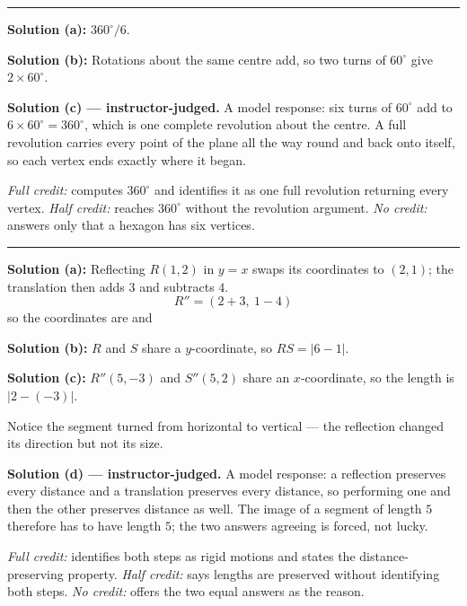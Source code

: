 \documentclass[12pt]{article}
\begin{document}
\vspace{0.2cm}\noindent\rule{\linewidth}{0.2pt}


\textbf{Solution (a):} $360^\circ / 6$. 

\textbf{Solution (b):} Rotations about the same centre add, so two turns of $60^\circ$ give $2 \times 60^\circ$. 

\textbf{Solution (c) --- instructor-judged.} A model response: six turns of $60^\circ$ add to $6 \times 60^\circ = 360^\circ$, which is one complete revolution about the centre. A full revolution carries every point of the plane all the way round and back onto itself, so each vertex ends exactly where it began.

\emph{Full credit:} computes $360^\circ$ and identifies it as one full revolution returning every vertex. \emph{Half credit:} reaches $360^\circ$ without the revolution argument. \emph{No credit:} answers only that a hexagon has six vertices.

\vspace{0.2cm}\noindent\rule{\linewidth}{0.2pt}


\textbf{Solution (a):} Reflecting $R(1, 2)$ in $y = x$ swaps its coordinates to $(2, 1)$; the translation then adds $3$ and subtracts $4$.
\[ R'' = (2 + 3,\ 1 - 4) \]
so the coordinates are  and 

\textbf{Solution (b):} $R$ and $S$ share a $y$-coordinate, so $RS = |6 - 1|$. 

\textbf{Solution (c):} $R''(5, -3)$ and $S''(5, 2)$ share an $x$-coordinate, so the length is $|2 - (-3)|$. 

Notice the segment turned from horizontal to vertical --- the reflection changed its direction but not its size.

\textbf{Solution (d) --- instructor-judged.} A model response: a reflection preserves every distance and a translation preserves every distance, so performing one and then the other preserves distance as well. The image of a segment of length $5$ therefore has to have length $5$; the two answers agreeing is forced, not lucky.

\emph{Full credit:} identifies both steps as rigid motions and states the distance-preserving property. \emph{Half credit:} says lengths are preserved without identifying both steps. \emph{No credit:} offers the two equal answers as the reason.
\end{document}
